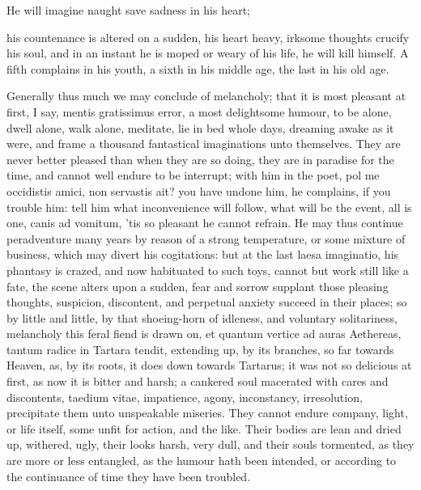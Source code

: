 {He will imagine naught save sadness in his heart;

his countenance is altered on a sudden, his heart heavy, irksome
thoughts crucify his soul, and in an instant he is moped or weary of
his life, he will kill himself. A fifth complains in his youth, a sixth
in his middle age, the last in his old age.

Generally thus much we may conclude of melancholy; that it is
most pleasant at first, I say, mentis gratissimus error, a
most delightsome humour, to be alone, dwell alone, walk alone,
meditate, lie in bed whole days, dreaming awake as it were, and frame a
thousand fantastical imaginations unto themselves. They are never
better pleased than when they are so doing, they are in paradise for
the time, and cannot well endure to be interrupt; with him in the poet,
pol me occidistis amici, non servastis ait? you have undone him,
he complains, if you trouble him: tell him what inconvenience will
follow, what will be the event, all is one, canis ad vomitum,
'tis so pleasant he cannot refrain. He may thus continue
peradventure many years by reason of a strong temperature, or some
mixture of business, which may divert his cogitations: but at the last
laesa imaginatio, his phantasy is crazed, and now habituated to such
toys, cannot but work still like a fate, the scene alters upon a
sudden, fear and sorrow supplant those pleasing thoughts, suspicion,
discontent, and perpetual anxiety succeed in their places; so by little
and little, by that shoeing-horn of idleness, and voluntary
solitariness, melancholy this feral fiend is drawn on, et quantum
vertice ad auras Aethereas, tantum radice in Tartara tendit, extending
up, by its branches, so far towards Heaven, as, by its roots, it does
down towards Tartarus; it was not so delicious at first, as now it is
bitter and harsh; a cankered soul macerated with cares and discontents,
taedium vitae, impatience, agony, inconstancy, irresolution,
precipitate them unto unspeakable miseries. They cannot endure company,
light, or life itself, some unfit for action, and the like. Their
bodies are lean and dried up, withered, ugly, their looks harsh, very
dull, and their souls tormented, as they are more or less entangled, as
the humour hath been intended, or according to the continuance of time
they have been troubled.

}
